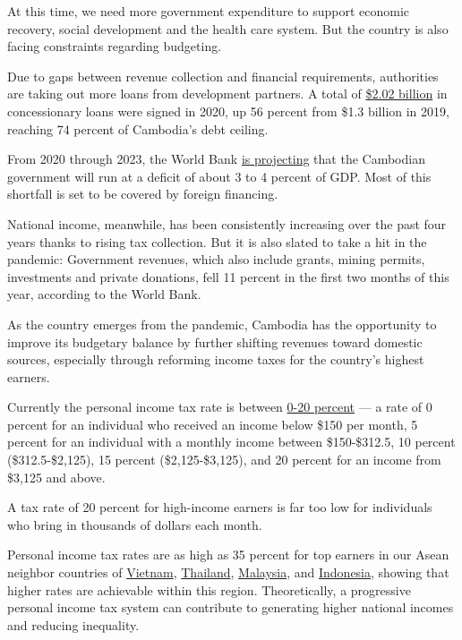 \documentclass[10pt,a4paper]{letter}
\begin{document}
At this time, we need more government expenditure to support economic recovery, social development and the health care system. But the country is also facing constraints regarding budgeting.

Due to gaps between revenue collection and financial requirements, authorities are taking out more loans from development partners. A total of \href{https://www.phnompenhpost.com/special-reports/cambodia-strives-keep-its-finances-together-despite-rising-impacts}{\$2.02 billion} in concessionary loans were signed in 2020, up 56 percent from \$1.3 billion in 2019, reaching 74 percent of Cambodia's debt ceiling.

From 2020 through 2023, the World Bank \href{https://www.worldbank.org/en/news/press-release/2021/06/16/cambodia-country-economic-update-june-2021-cambodia-s-economy-recovering-but-uncertainties-remain}{is projecting} that the Cambodian government will run at a deficit of about 3 to 4 percent of GDP. Most of this shortfall is set to be covered by foreign financing.

National income, meanwhile, has been consistently increasing over the past four years thanks to rising tax collection. But it is also slated to take a hit in the pandemic: Government revenues, which also include grants, mining permits, investments and private donations, fell 11 percent in the first two months of this year, according to the World Bank.

As the country emerges from the pandemic, Cambodia has the opportunity to improve its budgetary balance by further shifting revenues toward domestic sources, especially through reforming income taxes for the country's highest earners.

Currently the personal income tax rate is between \href{https://taxsummaries.pwc.com/cambodia/individual/taxes-on-personal-income}{0-20 percent} --- a rate of 0 percent for an individual who received an income below \$150 per month, 5 percent for an individual with a monthly income between \$150-\$312.5, 10 percent (\$312.5-\$2,125), 15 percent (\$2,125-\$3,125), and 20 percent for an income from \$3,125 and above.

A tax rate of 20 percent for high-income earners is far too low for individuals who bring in thousands of dollars each month.

Personal income tax rates are as high as 35 percent for top earners in our Asean neighbor countries of  \href{https://taxsummaries.pwc.com/vietnam/individual/taxes-on-personal-income}{Vietnam}, \href{https://www.rd.go.th/english/6045.html}{Thailand}, \href{https://santandertrade.com/en/portal/establish-overseas/malaysia/tax-system}{Malaysia}, and \href{https://taxsummaries.pwc.com/indonesia/individual/taxes-on-personal-income}{Indonesia}, showing that higher rates are achievable within this region. Theoretically, a progressive personal income tax system can contribute to generating higher national incomes and reducing inequality.
\end{document}
